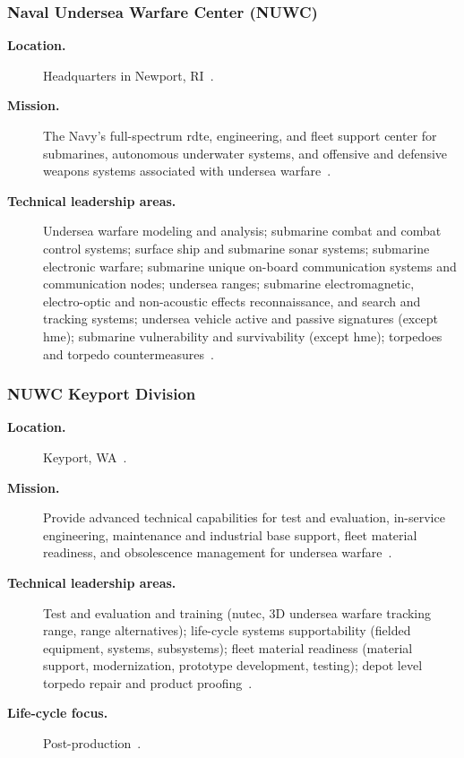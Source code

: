 \documentclass[../main.tex]{subfiles}
\begin{document}
\subsubsection{Naval Undersea Warfare Center (NUWC)}
\begin{description}
  \item[\textbf{Location.}] Headquarters in Newport, RI~\autocite{edo-2-1-4-warfare-centers-2024}.
  \item[\textbf{Mission.}] The Navy's full-spectrum \ac{rdte}, engineering, and fleet support center for submarines, autonomous underwater systems, and offensive and defensive weapons systems associated with undersea warfare~\autocite{edo-2-1-4-warfare-centers-2024}.
  \item[\textbf{Technical leadership areas.}] Undersea warfare modeling and analysis; submarine combat and combat control systems; surface ship and submarine sonar systems; submarine electronic warfare; submarine unique on-board communication systems and communication nodes; undersea ranges; submarine electromagnetic, electro-optic and non-acoustic effects reconnaissance, and search and tracking systems; undersea vehicle active and passive signatures (except \ac{hme}); submarine vulnerability and survivability (except \ac{hme}); torpedoes and torpedo countermeasures~\autocite{edo-2-1-4-warfare-centers-2024}.
\end{description}

\subsubsection{NUWC Keyport Division}
\begin{description}
  \item[\textbf{Location.}] Keyport, WA~\autocite{edo-2-1-4-warfare-centers-2024}.
  \item[\textbf{Mission.}] Provide advanced technical capabilities for test and evaluation, in-service engineering, maintenance and industrial base support, fleet material readiness, and obsolescence management for undersea warfare~\autocite{edo-2-1-4-warfare-centers-2024}.
  \item[\textbf{Technical leadership areas.}] Test and evaluation and training (\ac{nutec}, 3D undersea warfare tracking range, range alternatives); life-cycle systems supportability (fielded equipment, systems, subsystems); fleet material readiness (material support, modernization, prototype development, testing); depot level torpedo repair and product proofing~\autocite{edo-2-1-4-warfare-centers-2024}.
  \item[\textbf{Life-cycle focus.}] Post-production~\autocite{edo-2-1-4-warfare-centers-2024}.
\end{description}
\end{document}
